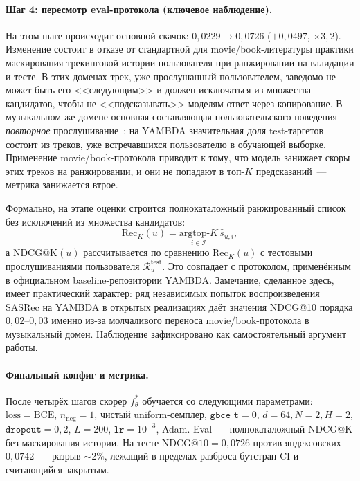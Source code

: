 \paragraph{Шаг 4: пересмотр eval-протокола (ключевое наблюдение).} На этом шаге происходит основной скачок: $0{,}0229 \to 0{,}0726$ ($+0{,}0497$, $\times 3{,}2$). Изменение состоит в отказе от стандартной для movie/book-литературы практики маскирования трекинговой истории пользователя при ранжировании на валидации и тесте. В этих доменах трек, уже прослушанный пользователем, заведомо не может быть его <<следующим>> и должен исключаться из множества кандидатов, чтобы не <<подсказывать>> моделям ответ через копирование. В музыкальном же домене основная составляющая пользовательского поведения~--- \emph{повторное} прослушивание~\cite{abbattista2024sequential, greer2025beyond}: на YAMBDA значительная доля test-таргетов состоит из треков, уже встречавшихся пользователю в обучающей выборке. Применение movie/book-протокола приводит к тому, что модель занижает скоры этих треков на ранжировании, и они не попадают в топ-$K$ предсказаний~--- метрика занижается втрое.

Формально, на этапе оценки строится полнокаталожный ранжированный список без исключений из множества кандидатов:
\begin{equation*}
    \mathrm{Rec}_K(u) = \underset{i \in \mathcal{I}}{\mathrm{argtop}\text{-}K}\, \hat{s}_{u, i},
\end{equation*}
а $\mathrm{NDCG@K}(u)$ рассчитывается по сравнению $\mathrm{Rec}_K(u)$ с тестовыми прослушиваниями пользователя $\mathcal{R}_u^{\mathrm{test}}$. Это совпадает с протоколом, применённым в официальном baseline-репозитории YAMBDA. Замечание, сделанное здесь, имеет практический характер: ряд независимых попыток воспроизведения SASRec на YAMBDA в открытых реализациях даёт значения NDCG@10 порядка $0{,}02$--$0{,}03$ именно из-за молчаливого переноса movie/book-протокола в музыкальный домен. Наблюдение зафиксировано как самостоятельный аргумент работы.

\paragraph{Финальный конфиг и метрика.} После четырёх шагов скорер $f_\theta^\ast$ обучается со следующими параметрами: $\mathrm{loss} = \mathrm{BCE}$, $n_{\mathrm{neg}} = 1$, чистый uniform-семплер, $\mathtt{gbce\_t} = 0$, $d = 64, N = 2, H = 2$, $\mathtt{dropout} = 0{,}2$, $L = 200$, $\mathtt{lr} = 10^{-3}$, Adam. Eval~--- полнокаталожный $\mathrm{NDCG@K}$ без маскирования истории. На тесте $\mathrm{NDCG@10} = 0{,}0726$ против яндексовских $0{,}0742$~--- разрыв $\sim\!2\%$, лежащий в пределах разброса бутстрап-CI и считающийся закрытым.

